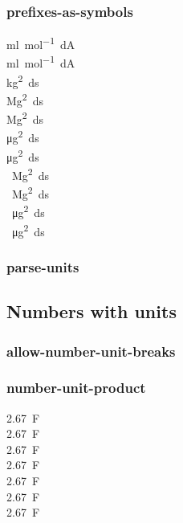 \documentclass{article}
\begin{document}
\subsubsection{prefixes-as-symbols}
\si{\milli\litre\per\mole\deci\ampere} \\
\si[prefixes-as-symbols=false]{\milli\litre\per\mole\deci\ampere}\\
\si[prefixes-as-symbols=false]{\kilo\gram\squared\deci\second}\\
\si{\mega\gram\squared\deci\second}\\
\si[prefixes-as-symbols=false]{\mega\gram\squared\deci\second}\\
\si{\micro\gram\squared\deci\second}\\
\si[prefixes-as-symbols=false]{\micro\gram\squared\deci\second}\\
\si{\per\mega\gram\squared\deci\second}\\
\si[prefixes-as-symbols=false]{\per\mega\gram\squared\deci\second}\\
\si{\per\micro\gram\squared\deci\second}\\
\si[prefixes-as-symbols=false]{\per\micro\gram\squared\deci\second}\\

\subsubsection{parse-units}

\subsection{Numbers with units}
\subsubsection{allow-number-unit-breaks}
\subsubsection{number-unit-product}
\SI{2.67}{\farad} \\
\SI[number-unit-product = \ ]{2.67}{\farad} \\
\SI[number-unit-product = ]{2.67}{\farad}\\
\SI[number-unit-product = \,]{2.67}{\farad}\\
\SI[number-unit-product = \;]{2.67}{\farad}\\
\SI[number-unit-product = $\times$]{2.67}{\farad}\\
\SI[color=blue,number-unit-product = $\times$]{2.67}{\farad}\\
\end{document}
